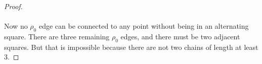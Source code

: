 \begin{proof}
\begin{figure}[H]
\begin{center}
\begin{tikzpicture}[scale=.8]
        \end{tikzpicture}
        \caption{}
      \end{center}
    \end{figure}

  \paragraph{}
  Now no $\rho_0$ edge can be connected to any point without being in an alternating square. There are three remaining $\rho_0$ edges, and there must be two adjacent squares. But that is impossible because there are not two chains of length at least 3.
\end{proof}
